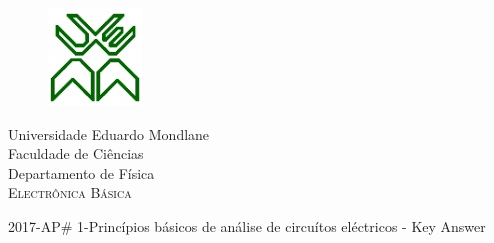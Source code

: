 \documentclass[12pt,a4paper,titlepage]{report}
\author{Bartolomeu J. Ubisse}
\begin{document}
\begin{figure}[htb]

\centering
\includegraphics[scale=1]{UEM-logotipo}
\end{figure}
\centering
{ \Large Universidade Eduardo Mondlane}\\[0.5cm] 
\large Faculdade de Ci\^encias\\[0.2cm]
 \large Departamento de F\'isica\\[1cm]

\textsc{Electr\^onica B\'asica} \\[1cm]
\begin{flushleft}
2017-AP\# 1-Princ\'ipios b\'asicos de an\'alise de circu\'itos el\'ectricos - Key Answer\\
\hrulefill
\end{flushleft}
\end{document}
